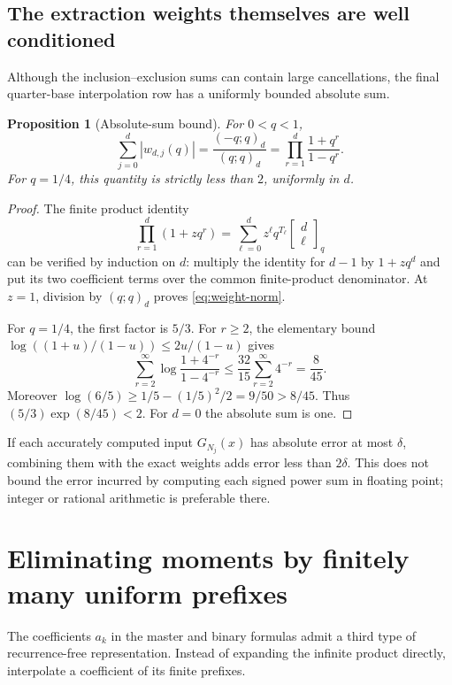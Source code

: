 \documentclass[11pt,a4paper]{article}
\numberwithin{equation}{section}
\newtheorem{proposition}[theorem]{Proposition}
\theoremstyle{definition}
\theoremstyle{remark}
\newcommand{\qbinom}[3]{\begin{bmatrix}#1\\#2\end{bmatrix}_{#3}}
\begin{document}
\subsection{The extraction weights themselves are well conditioned}
Although the inclusion--exclusion sums can contain large cancellations, the final quarter-base interpolation row has a uniformly bounded absolute sum.

\begin{proposition}[Absolute-sum bound]
\label{prop:weight-bound}
For $0<q<1$,
\begin{equation}
 \sum_{j=0}^{d}|w_{d,j}(q)|
   =\frac{(-q;q)_d}{(q;q)_d}
   =\prod_{r=1}^{d}\frac{1+q^r}{1-q^r}.
 \label{eq:weight-norm}
\end{equation}
For $q=1/4$, this quantity is strictly less than $2$, uniformly in $d$.
\end{proposition}
\begin{proof}
The finite product identity
\[
 \prod_{r=1}^{d}(1+zq^r)
 =\sum_{\ell=0}^{d}z^\ell q^{T_\ell}\qbinom{d}{\ell}{q}
\]
can be verified by induction on $d$: multiply the identity for $d-1$ by $1+zq^d$ and put its two coefficient terms over the common finite-product denominator. At $z=1$, division by $(q;q)_d$ proves \cref{eq:weight-norm}.

For $q=1/4$, the first factor is $5/3$. For $r\ge2$, the elementary bound
$\log((1+u)/(1-u))\le2u/(1-u)$ gives
\[
 \sum_{r=2}^{\infty}\log\frac{1+4^{-r}}{1-4^{-r}}
 \le\frac{32}{15}\sum_{r=2}^{\infty}4^{-r}
 =\frac8{45}.
\]
Moreover $\log(6/5)\ge1/5-(1/5)^2/2=9/50>8/45$. Thus
$(5/3)\exp(8/45)<2$. For $d=0$ the absolute sum is one.
\end{proof}
If each accurately computed input $G_{N_j}(x)$ has absolute error at most $\delta$, combining them with the exact weights adds error less than $2\delta$. This does not bound the error incurred by computing each signed power sum in floating point; integer or rational arithmetic is preferable there.

\section{Eliminating moments by finitely many uniform prefixes}
\label{sec:moment-extraction}

The coefficients $a_k$ in the master and binary formulas admit a third type of recurrence-free representation. Instead of expanding the infinite product directly, interpolate a coefficient of its finite prefixes.
\end{document}
